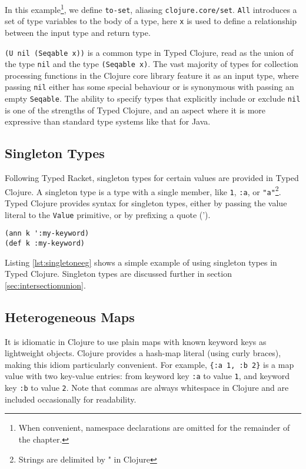 In this example\footnote{When convenient, namespace declarations are omitted for the remainder of the chapter.}, 
we define \lstinline|to-set|, aliasing \lstinline|clojure.core/set|.
\lstinline|All| introduces a set of type variables to the body of a type,
here \lstinline|x| is used to define a relationship between the input type and return type.

\lstinline|(U nil (Seqable x))| is a common type in Typed Clojure, read as the union
of the type \lstinline|nil| and the type \lstinline|(Seqable x)|.
The vast majority of types for collection processing functions in the Clojure core library feature
it as an input type, where passing \lstinline|nil| either has some special behaviour 
or is synonymous with passing an empty \lstinline|Seqable|.
The ability to specify types that explicitly include or exclude \lstinline|nil| is one of the strengths
of Typed Clojure, and an aspect where it is more expressive than standard type systems like that for Java.

\subsection{Singleton Types}

Following Typed Racket, singleton types for certain values are provided
in Typed Clojure.
A singleton type is a type with a single member, like \lstinline|1|,
\lstinline|:a|, or \lstinline|"a"|\footnote{Strings are delimited by " in Clojure}.
Typed Clojure provides syntax for singleton types, either by passing
the value literal to the \lstinline|Value| primitive, or by prefixing
a quote (').

\begin{lstlisting}[caption=Singleton Types, label=lst:singletoneeg]
(ann k ':my-keyword)
(def k :my-keyword)
\end{lstlisting}

Listing \ref{lst:singletoneeg} shows a simple example of using
singleton types in Typed Clojure.
Singleton types are discussed further in section \ref{sec:intersectionunion}.

\subsection{Heterogeneous Maps}

It is idiomatic in Clojure to use plain maps with known keyword keys as lightweight objects.
Clojure provides a hash-map literal (using curly braces), making this idiom particularly
convenient.
For example,
\lstinline|{:a 1, :b 2}| is a map value with two key-value entries: from keyword key \lstinline|:a|
to value \lstinline|1|, and keyword key \lstinline|:b| to value \lstinline|2|. Note that commas are always
whitespace in Clojure and are included occasionally for readability.

